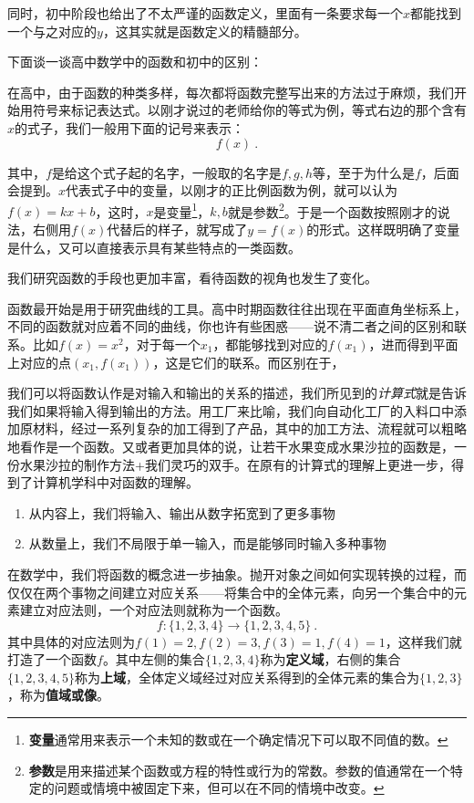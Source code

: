 同时，初中阶段也给出了不太严谨的函数定义，里面有一条要求每一个$x$都能找到一个与之对应的$y$，这其实就是函数定义的精髓部分。

下面谈一谈高中数学中的函数和初中的区别：

在高中，由于函数的种类多样，每次都将函数完整写出来的方法过于麻烦，我们开始用符号来标记表达式。以刚才说过的老师给你的等式为例，等式右边的那个含有$x$的式子，我们一般用下面的记号来表示：
\begin{equation}
f(x)~.
\end{equation}

其中，$f$是给这个式子起的名字，一般取的名字是$f,g,h$等，至于为什么是$f$，后面会提到。$x$代表式子中的变量，以刚才的正比例函数为例，就可以认为$f(x)=kx+b$，这时，$x$是变量\footnote{\textbf{变量}通常用来表示一个未知的数或在一个确定情况下可以取不同值的数。}，$k,b$就是参数\footnote{\textbf{参数}是用来描述某个函数或方程的特性或行为的常数。参数的值通常在一个特定的问题或情境中被固定下来，但可以在不同的情境中改变。}。于是一个函数按照刚才的说法，右侧用$f(x)$代替后的样子，就写成了$y=f(x)$的形式。这样既明确了变量是什么，又可以直接表示具有某些特点的一类函数。

我们研究函数的手段也更加丰富，看待函数的视角也发生了变化。



函数最开始是用于研究曲线的工具。高中时期函数往往出现在平面直角坐标系上，不同的函数就对应着不同的曲线，你也许有些困惑——说不清二者之间的区别和联系。比如$f(x)=x^2$，对于每一个$x_1$，都能够找到对应的$f(x_1)$，进而得到平面上对应的点$(x_1,f(x_1))$，这是它们的联系。而区别在于，


我们可以将函数认作是对输入和输出的关系的描述，我们所见到的\textsl{计算式}就是告诉我们如果将输入得到输出的方法。用工厂来比喻，我们向自动化工厂的入料口中添加原材料，经过一系列复杂的加工得到了产品，其中的加工方法、流程就可以粗略地看作是一个函数。又或者更加具体的说，让若干水果变成水果沙拉的函数是，一份水果沙拉的制作方法+我们灵巧的双手。在原有的计算式的理解上更进一步，得到了计算机学科中对函数的理解。

\begin{enumerate}
\item 从内容上，我们将输入、输出从数字拓宽到了更多事物
\item 从数量上，我们不局限于单一输入，而是能够同时输入多种事物
\end{enumerate}

在数学中，我们将函数的概念进一步抽象。抛开对象之间如何实现转换的过程，而仅仅在两个事物之间建立对应关系——将集合中的全体元素，向另一个集合中的元素建立对应法则，一个对应法则就称为一个函数。
$$f:\{1,2,3,4\}\to\{1,2,3,4,5\}~.$$
其中具体的对应法则为$f(1)=2,f(2)=3,f(3)=1,f(4)=1$，这样我们就打造了一个函数$f$。其中左侧的集合$\{1,2,3,4\}$称为\textbf{定义域}，右侧的集合$\{1,2,3,4,5\}$称为\textbf{上域}，全体定义域经过对应关系得到的全体元素的集合为$\{1,2,3\}$，称为\textbf{值域或像}。

